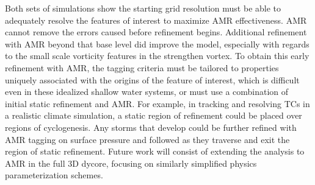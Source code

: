 Both sets of simulations show the starting grid resolution must be
able to adequately resolve the features of interest to maximize
AMR effectiveness. AMR cannot remove the errors
caused before refinement begins. Additional refinement with
AMR beyond that base level did improve the model, especially
with regards to the small scale vorticity features in the strengthen vortex.
To obtain this early refinement with AMR, the tagging
criteria must be tailored to properties uniquely associated
with the origins of the feature of interest, which is difficult even in these 
idealized shallow water systems, or must use a combination of initial static refinement 
and AMR. For example, in tracking and resolving TCs in a realistic climate simulation, a static region of refinement
could be placed over regions of cyclogenesis. Any storms that
develop could be further refined with AMR tagging on
surface pressure and followed as they traverse
and exit the region of static refinement.
Future work will consist of extending the analysis
to AMR in the full 3D dycore, focusing on
similarly simplified physics parameterization schemes.
